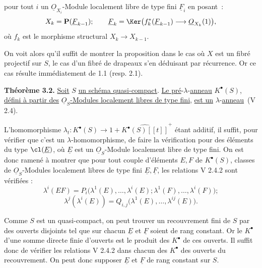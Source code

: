 
pour tout \(i\) un \(\underline{O}_{X_i}\)-Module localement libre de type fini \(\underline{F}_i\) en posant~:
\[
  X_k=\mathbf P(\underline{F}_{k-1});\qquad
  \underline{F}_k=\Ker\bigl(f_k^*(\underline{F}_{k-1})\longrightarrow \underline{O}_{X_k}(1)\bigr),
\]
où \(f_k\) est le morphisme structural \(X_k\to X_{k-1}\).

On voit alors qu'il suffit de montrer la proposition dans le cas où \(X\) est un fibré projectif sur \(S\), le cas d'un fibré de drapeaux s'en déduisant par récurrence. Or ce cas résulte immédiatement de 1.1 (resp. 2.1).

\textbf{Théorème 3.2.} \uline{Soit} \(S\) \uline{un schéma quasi-compact}. \uline{Le pré}-\(\lambda\)-\uline{anneau} \(K^{\bullet}(S)\), \uline{défini à partir des} \(\underline{O}_S\)\uline{-Modules localement libres de type fini}, \uline{est un} \(\lambda\)-\uline{anneau}~(V 2.4).

L'homomorphisme \(\lambda_t:K^{\bullet}(S)\longrightarrow 1+\widehat{K^{\bullet}(S)[[t]]}^{+}\) étant additif, il suffit, pour vérifier que c'est un \(\lambda\)-homomorphisme, de faire la vérification pour des éléments du type \(\cl(\underline{E})\), où \(\underline{E}\) est un \(\underline{O}_S\)-Module localement libre de type fini. On est donc ramené à montrer que pour tout couple d'éléments \(E,F\) de \(K^{\bullet}(S)\), classes de \(\underline{O}_S\)-Modules localement libres de type fini \(\underline{E},\underline{F}\), les relations V 2.4.2 sont vérifiées :
\[
  \lambda^i(EF)=P_i\bigl(\lambda^1(E),\ldots,\lambda^i(E);\lambda^1(F),\ldots,\lambda^i(F)\bigr);
\]
\[
  \lambda^j(\lambda^i(E))=Q_{i,j}\bigl(\lambda^1(E),\ldots,\lambda^{ij}(E)\bigr).
\]

Comme \(S\) est un quasi-compact, on peut trouver un recouvrement fini de \(S\) par des ouverts disjoints tel que sur chacun \(\underline{E}\) et \(\underline{F}\) soient de rang constant. Or le \(K^{\bullet}\) d'une somme directe finie d'ouverts est le produit des \(K^{\bullet}\) de ces ouverts. Il suffit donc de vérifier les relations V 2.4.2 dans chacun des \(K^{\bullet}\) des ouverts du recouvrement. On peut donc supposer \(\underline{E}\) et \(\underline{F}\) de rang constant sur \(S\).

